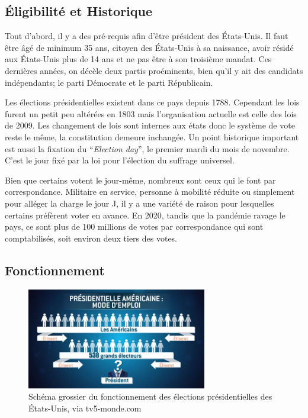 \documentclass[11pt,a4paper]{report}
\begin{document}
\subsection{Éligibilité et Historique}

Tout d’abord, il y a des pré-requis afin d’être président des États-Unis.
Il faut être âgé de minimum 35 ans, citoyen des États-Unis à sa naissance, avoir résidé aux États-Unis plus de 14 ans et ne pas être à son troisième mandat.
Ces dernières années, on décèle deux partis proéminents, bien qu'il y ait des candidats indépendants; le parti Démocrate et le parti Républicain.

Les élections présidentielles existent dans ce pays depuis 1788.
Cependant les lois furent un petit peu altérées en 1803 mais l'organisation actuelle est celle des lois de 2009.
Les changement de lois sont internes aux états donc le système de vote reste le même, la constitution demeure inchangée.
Un point historique important est aussi la fixation du “\textit{Election day}”, le premier mardi du mois de novembre.
C’est le jour fixé par la loi pour l'élection du suffrage universel.

Bien que certains votent le jour-même, nombreux sont ceux qui le font par correspondance.
Militaire en service, personne à mobilité réduite ou simplement pour alléger la charge le jour J, il y a une variété de raison pour lesquelles certains préfèrent voter en avance.
En 2020, tandis que la pandémie ravage le pays, ce sont plus de 100 millions de votes par correspondance qui sont comptabilisés, soit environ deux tiers des votes. \nocite{electproj:electproj}

\subsection{Fonctionnement} %

\begin{figure}[h]
	\centering
	\includegraphics[width=0.7\textwidth]{./images/Mode-Vote-USA2020.jpg}
	\caption{Schéma grossier du fonctionnement des élections présidentielles des États-Unis, via tv5-monde.com \cite{tv5:election}}
	\label{USA:ElectionMode}
\end{figure}
\end{document}
